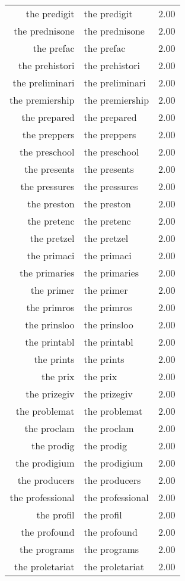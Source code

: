 \begin{table}[ht]
\begin{tabular}{rlr}
  the predigit & the predigit & 2.00 \\ 
  the prednisone & the prednisone & 2.00 \\ 
  the prefac & the prefac & 2.00 \\ 
  the prehistori & the prehistori & 2.00 \\ 
  the preliminari & the preliminari & 2.00 \\ 
  the premiership & the premiership & 2.00 \\ 
  the prepared & the prepared & 2.00 \\ 
  the preppers & the preppers & 2.00 \\ 
  the preschool & the preschool & 2.00 \\ 
  the presents & the presents & 2.00 \\ 
  the pressures & the pressures & 2.00 \\ 
  the preston & the preston & 2.00 \\ 
  the pretenc & the pretenc & 2.00 \\ 
  the pretzel & the pretzel & 2.00 \\ 
  the primaci & the primaci & 2.00 \\ 
  the primaries & the primaries & 2.00 \\ 
  the primer & the primer & 2.00 \\ 
  the primros & the primros & 2.00 \\ 
  the prinsloo & the prinsloo & 2.00 \\ 
  the printabl & the printabl & 2.00 \\ 
  the prints & the prints & 2.00 \\ 
  the prix & the prix & 2.00 \\ 
  the prizegiv & the prizegiv & 2.00 \\ 
  the problemat & the problemat & 2.00 \\ 
  the proclam & the proclam & 2.00 \\ 
  the prodig & the prodig & 2.00 \\ 
  the prodigium & the prodigium & 2.00 \\ 
  the producers & the producers & 2.00 \\ 
  the professional & the professional & 2.00 \\ 
  the profil & the profil & 2.00 \\ 
  the profound & the profound & 2.00 \\ 
  the programs & the programs & 2.00 \\ 
  the proletariat & the proletariat & 2.00 \\ 

\end{tabular}
\end{table}
